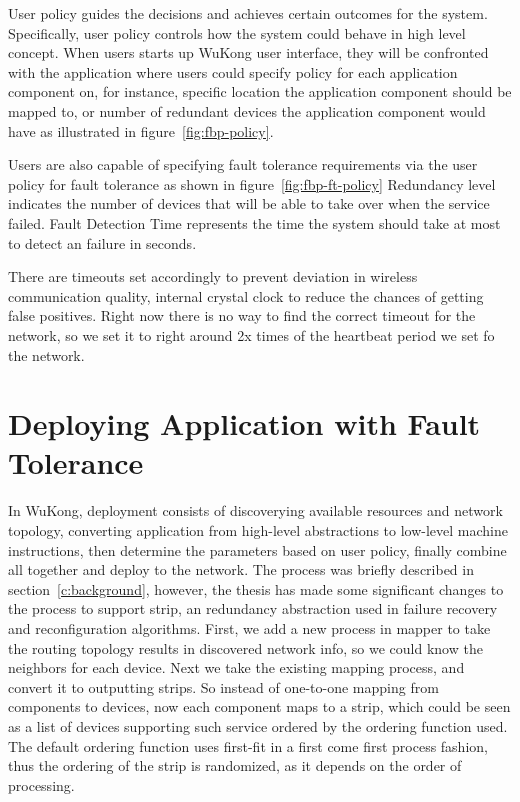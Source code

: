 User policy guides the decisions and achieves certain outcomes for the system.
Specifically, user policy controls how the system could behave in high level
concept.
When users starts up WuKong user interface, they will be confronted with the
application where users could specify policy for each application component on,
for instance, specific location the application component should be mapped to,
or number of redundant devices the application component would have as
illustrated in figure~\ref{fig:fbp-policy}.

Users are also capable of specifying fault tolerance requirements via the
user policy for fault tolerance as shown in figure~\ref{fig:fbp-ft-policy}
Redundancy level indicates the number of devices that will be able to take over
when the service failed. Fault Detection Time represents the time the system
should take at most to detect an failure in seconds.

There are timeouts set accordingly to prevent deviation in wireless communication quality,
internal crystal clock to reduce the chances of getting false positives. Right
now there is no way to find the correct timeout for the network, so we set it to
right around 2x times of the heartbeat period we set fo the network.

\section{Deploying Application with Fault Tolerance}

In WuKong, deployment consists of discoverying available resources and network
topology, converting application from high-level abstractions to low-level
machine instructions, then determine the parameters based on user policy,
finally combine all together and deploy to the network. The process was briefly
described in section~\ref{c:background}, however, the thesis has made some
significant changes to the process to support strip, an redundancy abstraction
used in failure recovery and reconfiguration algorithms. First, we add a new
process in mapper to take the routing topology results in discovered network
info, so we could know the neighbors for each device. Next we take the existing
mapping process, and convert it to outputting strips. So instead of one-to-one
mapping from components to devices, now each component maps to a strip, which
could be seen as a list of devices supporting such service ordered by the
ordering function used. The default ordering function uses first-fit in a first
come first process fashion, thus the ordering of the strip is randomized, as it
depends on the order of processing.

